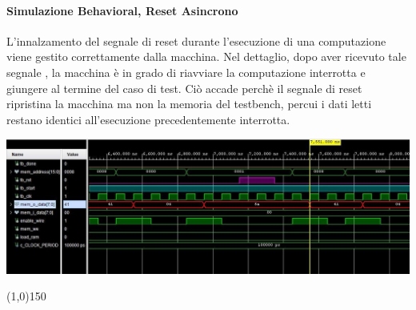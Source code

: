 \documentclass{article}
\begin{document}
\paragraph{Simulazione Behavioral, Reset Asincrono}

L'innalzamento del segnale di reset durante l'esecuzione di una computazione viene gestito correttamente dalla macchina. Nel dettaglio, dopo aver ricevuto tale segnale , la macchina è in grado di riavviare la computazione interrotta e giungere al termine del caso di test. Ciò accade perchè il segnale di reset ripristina la macchina ma non la memoria del testbench, percui i dati letti restano identici all'esecuzione precedentemente interrotta.

\begin{flushleft}
\includegraphics[scale=0.53]{Rst_Async} \\
\end{flushleft}

\bigskip

\begin{center}
\line(1,0){150}
\end{center}

\bigskip
\end{document}

